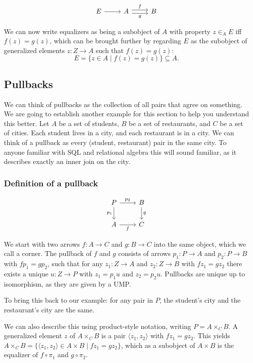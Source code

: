 \documentclass[11pt]{article}
\begin{document}
\[
\begin{tikzcd}
  E \ar[r] & A \ar[r, "f", shift left] \ar[r, "g"', shift right] & B
\end{tikzcd}
\]

We can now write equalizers as being a subobject of $A$ with property $z
\in_{A} E$ iff $f(z) = g(z)$, which can be brought further by regarding $E$ as
the subobject of generalized elements $z: Z \rightarrow A$ such that $f(z) =
g(z)$:
$$
E = \{ z \in A \mid f(z) = g(z) \} \subseteq A.
$$

\subsection{Pullbacks}

We can think of pullbacks as the collection of all pairs that agree on
something. We are going to establish another example for this section to help
you understand this better. Let $A$ be a set of students, $B$ be a set of
restaurants, and $C$ be a set of cities. Each student lives in a city, and each
restaurant is in a city. We can think of a pullback as every (student,
restaurant) pair in the same city. To anyone familiar with SQL and relational
algebra this will sound familiar, as it describes exactly an inner join on the
city.

\subsubsection{Definition of a pullback}

\[
\begin{tikzcd}
  P \ar[d, "p_{1}"'] \ar[r, "p_{2}"] & B \ar[d, "g"] \\
  A \ar[r, "f"'] & C
\end{tikzcd}
\]

We start with two arrows $f: A \rightarrow C$ and $g: B \rightarrow C$ into the
same object, which we call a corner. The pullback of $f$ and $g$ consists of
arrows $p_{1}: P \rightarrow A$ and $p_{2}: P \rightarrow B$ with $fp_{1} =
gp_{2}$, such that for any $z_{1}: Z \rightarrow A$ and $z_{2}: Z \rightarrow B$
with $fz_{1} = gz_{2}$ there exists a unique $u: Z \rightarrow P$ with $z_{1} =
p_{1}u$ and $z_{2} = p_{2}u$. Pullbacks are unique up to isomorphism, as they
are given by a UMP.

To bring this back to our example: for any pair in $P$, the student's city and
the restaurant's city are the same.

We can also describe this using product-style notation, writing $P = A \times_{C}
B$. A generalized element $z$ of $A \times_{C} B$ is a pair $\langle z_{1}, z_{2}
\rangle$ with $fz_{1} = gz_{2}$. This yields $A \times_{C} B = \{ \langle z_{1},
z_{2} \rangle \in A \times B \mid fz_{1} = gz_{2} \}$, which as a subobject of
$A \times B$ is the equalizer of $f \circ \pi_{1}$ and $g \circ \pi_{2}$.
\end{document}
